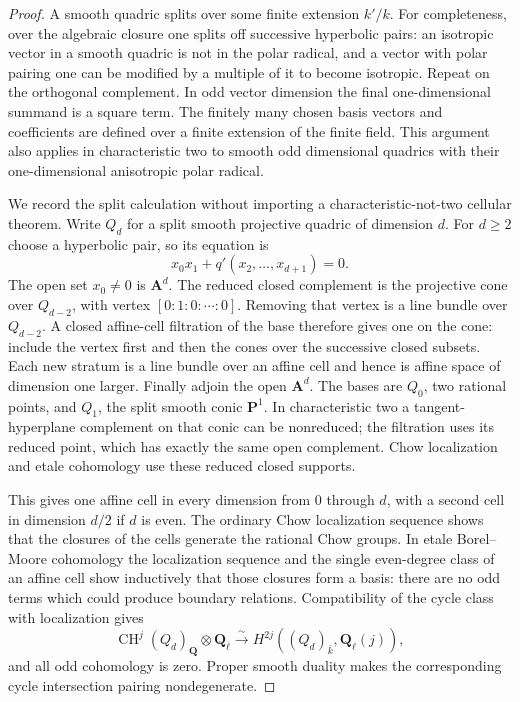 \begin{proof}
A smooth quadric splits over some finite extension $k'/k$.
For completeness, over the algebraic closure one splits off
successive hyperbolic pairs: an isotropic vector in a smooth
quadric is not in the polar radical, and a vector with polar
pairing one can be modified by a multiple of it to become
isotropic. Repeat on the orthogonal complement. In odd vector
dimension the final one-dimensional summand is a square term.
The finitely many chosen basis vectors and coefficients are
defined over a finite extension of the finite field. This
argument also applies in characteristic two to smooth odd
dimensional quadrics with their one-dimensional anisotropic
polar radical.

We record the split calculation without importing a
characteristic-not-two cellular theorem. Write $Q_d$ for a
split smooth projective quadric of dimension $d$. For $d\ge2$
choose a hyperbolic pair, so its equation is
\[
                  x_0x_1+q'(x_2,\ldots,x_{d+1})=0.
 \tag{C217.1}\label{r17c2:split-equation}
\]
The open set $x_0\ne0$ is $\mathbf A^d$. The reduced
closed complement is the projective cone over $Q_{d-2}$,
with vertex $[0:1:0:\cdots:0]$. Removing that vertex is
a line bundle over $Q_{d-2}$. A closed affine-cell filtration
of the base therefore gives one on the cone: include the
vertex first and then the cones over the successive closed
subsets. Each new stratum is a line bundle over an affine
cell and hence is affine space of dimension one larger.
Finally adjoin the open $\mathbf A^d$.
The bases are $Q_0$, two rational points, and $Q_1$, the
split smooth conic $\mathbf P^1$. In characteristic two
a tangent-hyperplane complement on that conic can be
nonreduced; the filtration uses its reduced point, which
has exactly the same open complement. Chow localization
and etale cohomology use these reduced closed supports.

This gives one affine cell in every dimension from $0$
through $d$, with a second cell in dimension $d/2$ if
$d$ is even. The ordinary Chow localization sequence
shows that the closures of the cells generate the rational
Chow groups. In etale Borel--Moore cohomology the localization
sequence and the single even-degree class of an affine cell
show inductively that those closures form a basis: there
are no odd terms which could produce boundary relations.
Compatibility of the cycle class with localization gives
\[
 \operatorname{CH}^j(Q_d)_{\mathbf Q}\otimes\mathbf Q_\ell
        \xrightarrow{\sim}
 H^{2j}((Q_d)_{\bar k},\mathbf Q_\ell(j)),
 \tag{C217.2}\label{r17c2:split-cycle-iso}
\]
and all odd cohomology is zero. Proper smooth duality makes
the corresponding cycle intersection pairing nondegenerate.


\end{proof}
